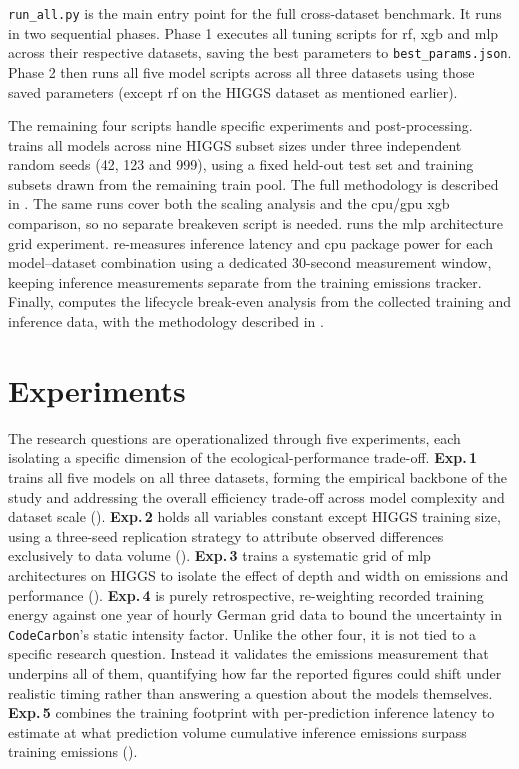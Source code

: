 \texttt{run\_all.py} is the main entry point for the full cross-dataset benchmark. It runs in two sequential phases. Phase 1 executes all tuning scripts for \gls{rf}, \gls{xgb} and \gls{mlp} across their respective datasets, saving the best parameters to \texttt{best\_params.json}. Phase 2 then runs all five model scripts across all three datasets using those saved parameters (except \gls{rf} on the HIGGS dataset as mentioned earlier).

The remaining four scripts handle specific experiments and post-processing.  trains all models across nine HIGGS subset sizes under three independent random seeds (42, 123 and 999), using a fixed held-out test set and training subsets drawn from the remaining train pool. The full methodology is described in . The same runs cover both the scaling analysis and the \gls{cpu}/\gls{gpu} \gls{xgb} comparison, so no separate breakeven script is needed.  runs the \gls{mlp} architecture grid experiment.  re-measures inference latency and \gls{cpu} package power for each model--dataset combination using a dedicated 30-second measurement window, keeping inference measurements separate from the training emissions tracker. Finally,  computes the lifecycle break-even analysis from the collected training and inference data, with the methodology described in .

\section{Experiments}
\label{sec:experiments}

The research questions are operationalized through five experiments, each isolating a specific dimension of the ecological-performance trade-off. \textbf{Exp.\,1} trains all five models on all three datasets, forming the empirical backbone of the study and addressing the overall efficiency trade-off across model complexity and dataset scale (). \textbf{Exp.\,2} holds all variables constant except HIGGS training size, using a three-seed replication strategy to attribute observed differences exclusively to data volume (). \textbf{Exp.\,3} trains a systematic grid of \gls{mlp} architectures on HIGGS to isolate the effect of depth and width on emissions and performance (). \textbf{Exp.\,4} is purely retrospective, re-weighting recorded training energy against one year of hourly German grid data to bound the uncertainty in \texttt{CodeCarbon}'s static intensity factor. Unlike the other four, it is not tied to a specific research question. Instead it validates the emissions measurement that underpins all of them, quantifying how far the reported figures could shift under realistic timing rather than answering a question about the models themselves. \textbf{Exp.\,5} combines the training footprint with per-prediction inference latency to estimate at what prediction volume cumulative inference emissions surpass training emissions ().

